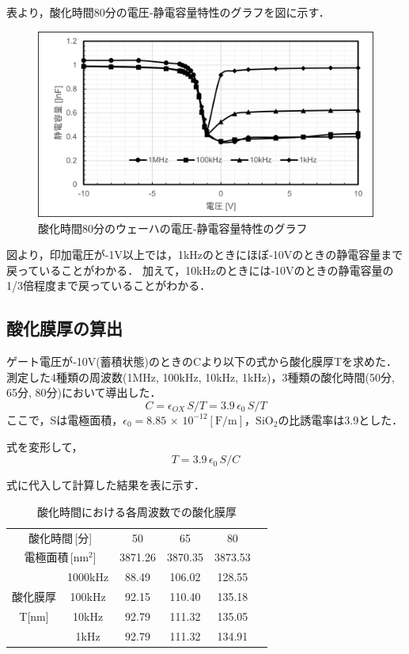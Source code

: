 \documentclass[11pt]{jarticle}
\begin{document}
			表より，酸化時間80分の電圧‐静電容量特性のグラフを図に示す．

			\begin{figure}[H]
			\centering
			\includegraphics[width = 12cm]{figs/wehacap80.png}
			\caption{酸化時間80分のウェーハの電圧‐静電容量特性のグラフ}
			\label{fig:wehacap80}
			\end{figure}

			図より，印加電圧が-1V以上では，1kHzのときにほぼ‐10Vのときの静電容量まで戻っていることがわかる．
			加えて，10kHzのときには‐10Vのときの静電容量の1/3倍程度まで戻っていることがわかる．

		\subsection{酸化膜厚の算出}
			ゲート電圧が‐10V(蓄積状態)のときのCより以下の式から酸化膜厚Tを求めた．
			測定した4種類の周波数(1MHz, 100kHz, 10kHz, 1kHz)，3種類の酸化時間(50分, 65分, 80分)において導出した．
			\begin{equation}
				C = \epsilon_{OX}\,S/T = 3.9\,\epsilon_{0}\,S/T
			\end{equation}
			ここで，Sは電極面積，$\epsilon_{0} = 8.85\,\times\,10^{-12} [\mathrm{F/m}]$，$\mathrm{SiO_{2}}$の比誘電率は3.9とした．

			式を変形して，
			\begin{equation}
				T = 3.9\,\epsilon_{0}\,S/C
				\label{func:sankamaku}
			\end{equation}

			式に代入して計算した結果を表に示す．
			\begin{table}[H]
			\begin{center}
			\caption{酸化時間における各周波数での酸化膜厚}
			\label{tab:sankamakukou}
			\begin{tabular}{cc|cccc} \toprule
				\multicolumn{2}{c|}{酸化時間\,[分]}&50&65&80\\
				\multicolumn{2}{c|}{電極面積\,[$\mathrm{nm^{2}}$]}&3871.26&3870.35&3873.53\\ \hline
				&1000kHz&88.49&106.02&128.55\\
				酸化膜厚&100kHz&92.15&110.40&135.18\\
				T[nm]&10kHz&92.79&111.32&135.05\\
				&1kHz&92.79&111.32&134.91\\ \bottomrule
			\end{tabular}
			\end{center}
			\end{table}
\end{document}
